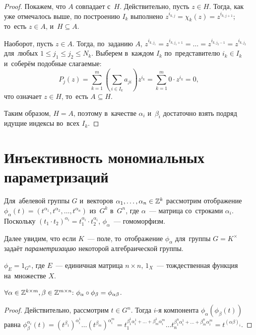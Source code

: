 \documentclass{article}
\begin{document}
\begin{proof}
  Покажем, что $A$ совпадает с~$H$. Действительно, пусть $z \in H$. Тогда, как уже отмечалось выше,
  по построению $I_k$ выполнено $z^{i_{k, j}} = \chi_k(z) = z^{i_{k, j + 1}}$; то~есть $z \in A$, и~$H \subseteq A$.

  Наоборот, пусть $z \in A$. Тогда, по~заданию $A$, $z^{i_{k, j_1}} = z^{i_{k, j_1 + 1}} = \ldots = z^{i_{k, j_2 - 1}} = z^{i_{k, j_2}}$
  для~любых $1 \leq j_1 \leq j_2 \leq N_k$. Выберем в~каждом $I_k$ по~представителю $i_k \in I_k$ и~соберём подобные слагаемые:
  $$
      P_j(z) = \sum_{k = 1}^{m} \left( \sum_{i \in I_k} a_{ji} \right) z^{i_k} = \sum_{k = 1}^{m} 0 \cdot z^{i_k} = 0,
  $$
  что означает $z \in H$, то~есть $A \subseteq H$.

  Таким образом, $H = A$, поэтому в~качестве $\alpha_i$ и~$\beta_i$ достаточно взять подряд идущие индексы во~всех $I_k$.
\end{proof}

\section{Инъективность мономиальных параметризаций}

Для~абелевой группы $G$ и~векторов $\alpha_1, \ldots, \alpha_n \in \mathbb{Z}^k$ рассмотрим отображение $\phi_\alpha(t) = (t^{\alpha_1}, t^{\alpha_2}, \ldots, t^{\alpha_n})$
из~$G^k$ в~$G^n$, где $\alpha$~— матрица со~строками $\alpha_i$. Поскольку $(t_1 \cdot t_2)^{\alpha_i} = t_1^{\alpha_i} \cdot t_2^{\alpha_i}$,
$\phi_\alpha$~— гомоморфизм.

Далее увидим, что если $K$~— поле, то~отображение $\phi_\alpha$ для~группы $G = K^\times$ задаёт \textit{параметризацию} некоторой алгебраической группы.

\begin{statement*}
    $\phi_{E} = 1_{G^n}$, где $E$~— единичная матрица $n \times n$, $1_X$~— тождественная функция на~множестве $X$.
\end{statement*}

\begin{statement*}
    $
        \forall \alpha \in \mathbb{Z}^{k \times m}, \beta \in \mathbb{Z}^{m \times n}{:}\ \phi_\alpha \circ \phi_\beta = \phi_{\alpha \beta}
    $.
\end{statement*}

\begin{proof}
    Действительно, рассмотрим $t \in G^n$. Тогда $i$-я компонента $\phi_\alpha(\phi_\beta(t))$
    равна $\phi_\beta^{\alpha_i}(t) = (t^{\beta_1})^{\alpha_i^1} \ldots (t^{\beta_m})^{\alpha_i^m}
                                    = t_1^{\beta_1^1 \alpha_i^1 + \ldots + \beta_m^1 \alpha_i^m}
                                      \ldots
                                      t_n^{\beta_1^n \alpha_i^1 + \ldots + \beta_m^n \alpha_i^m}
                                    = t^{(\alpha \beta)_i}$.
\end{proof}
\end{document}
